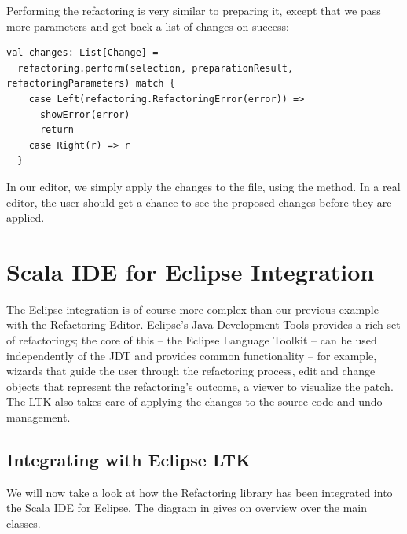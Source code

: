 \documentclass[10pt,a4paper,oneside]{scrreprt}
\begin{document}
Performing the refactoring is very similar to preparing it, except that we pass more parameters and get back a list of changes on success:

\begin{lstlisting}
val changes: List[Change] = 
  refactoring.perform(selection, preparationResult, refactoringParameters) match {
    case Left(refactoring.RefactoringError(error)) => 
      showError(error)
      return
    case Right(r) => r
  }
\end{lstlisting}

In our editor, we simply apply the changes to the file, using the  method. In a real editor, the user should get a chance to see the proposed changes before they are applied.

\section{Scala IDE for Eclipse Integration}

The Eclipse integration is of course more complex than our previous example with the Refactoring Editor. Eclipse's Java Development Tools provides a rich set of refactorings; the core of this -- the Eclipse Language Toolkit \cite{LTK} -- can be used independently of the JDT and provides common functionality -- for example, wizards that guide the user through the refactoring process, edit and change objects that represent the refactoring's outcome, a viewer to visualize the patch. The LTK also takes care of applying the changes to the source code and undo management. 

\subsection{Integrating with Eclipse LTK}

We will now take a look at how the Refactoring library has been integrated into the Scala IDE for Eclipse. The diagram in  gives on overview over the main classes. 
\end{document}
